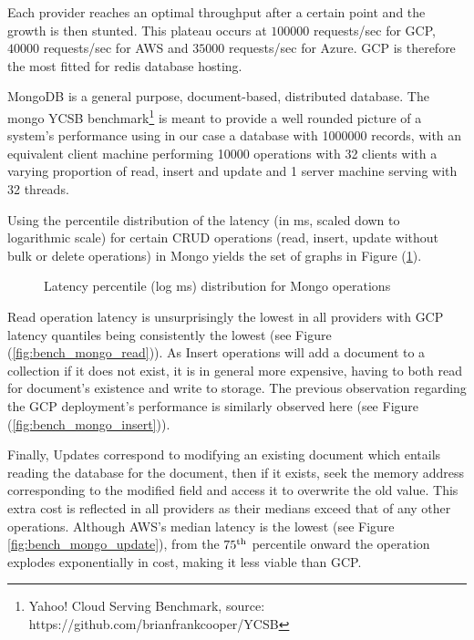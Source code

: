 \documentclass[11pt]{article}
\begin{document}
Each provider reaches an optimal throughput after a certain point and the growth is then stunted. This plateau occurs at $100 000$ requests/sec for GCP, $40 000$ requests/sec for AWS and $35 000$ requests/sec for Azure. GCP is therefore the most fitted for redis database hosting.


\vspace{-5mm}\hspace{5mm} MongoDB is a general purpose, document-based, distributed database. The mongo YCSB benchmark\footnote{Yahoo! Cloud Serving Benchmark, source: https://github.com/brianfrankcooper/YCSB} is meant to provide a well rounded picture of a system’s performance using in our case a database with 1000000 records, with an equivalent client machine performing 10000 operations with 32 clients with a varying proportion of read, insert and update and 1 server machine serving with 32 threads. 

Using the percentile distribution of the latency (in ms, scaled down to logarithmic scale) for certain CRUD operations (read, insert, update without bulk or delete operations) in Mongo yields the set of graphs in Figure (\ref{fig:bench_mongo}). 

\begin{figure}[!h]
    \centering
    \subfloat[Insert]{\label{fig:bench_mongo_insert}}\subfloat[Read]{\label{fig:bench_mongo_read}}
    \newline
    \subfloat[Update]{\label{fig:bench_mongo_update}}
    
    \caption{Latency percentile (log ms) distribution for Mongo operations}
    \label{fig:bench_mongo}
\end{figure}

Read operation latency is unsurprisingly the lowest in all providers with GCP latency quantiles being consistently the lowest (see Figure (\ref{fig:bench_mongo_read})). As Insert operations will add a document to a collection if it does not exist, it is in general more expensive, having to both read for document's existence and write to storage. The previous observation regarding the GCP deployment's performance is similarly observed here (see Figure (\ref{fig:bench_mongo_insert})). 

Finally, Updates correspond to modifying an existing document which entails reading the database for the document, then if it exists, seek the memory address corresponding to the modified field and access it to overwrite the old value. This extra cost is reflected in all providers as their medians exceed that of any other operations. Although AWS's median latency is the lowest (see Figure \ref{fig:bench_mongo_update}), from the $75\textsuperscript{th}$ percentile onward the operation explodes exponentially in cost, making it less viable than GCP. 
\end{document}
